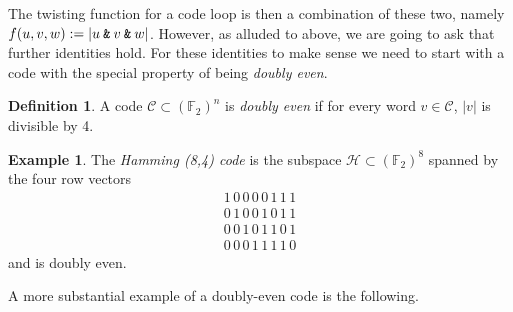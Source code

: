 \documentclass{article}
\theoremstyle{plain}
\theoremstyle{definition}
\newtheorem*{definition}{Definition}
\newtheorem{example}{Example}
\def \cC {\mathcal{C}}
\def \FF {\mathbb{F}}
\newcommand{\AND}{\mathbin{\textup{\texttt{\&}}}}
\begin{document}
The twisting function for a code loop is then a combination of these two, namely $f(u,v,w) := |u\AND v\AND w|$.
However, as alluded to above, we are going to ask that further identities hold. 
For these identities to make sense we need to start with a code with the special property of being \emph{doubly even}.

\begin{definition}
A code $\cC \subset (\FF_2)^n$ is \emph{doubly even} if for every word $v\in \cC$, $|v|$ is divisible by 4. 
\end{definition}


\begin{example}\label{example:Hamming}
The \emph{Hamming (8,4) code} is the subspace $\mathcal{H} \subset (\FF_2)^8$ spanned by the four row vectors
\[
\begin{array}{c}
1\,0\,0\,0\,0\,1\,1\,1\\
0\,1\,0\,0\,1\,0\,1\,1\\
0\,0\,1\,0\,1\,1\,0\,1\\
0\,0\,0\,1\,1\,1\,1\,0
\end{array}
\]
and is doubly even.
\end{example}

A more substantial example of a doubly-even code is the following.
\end{document}
